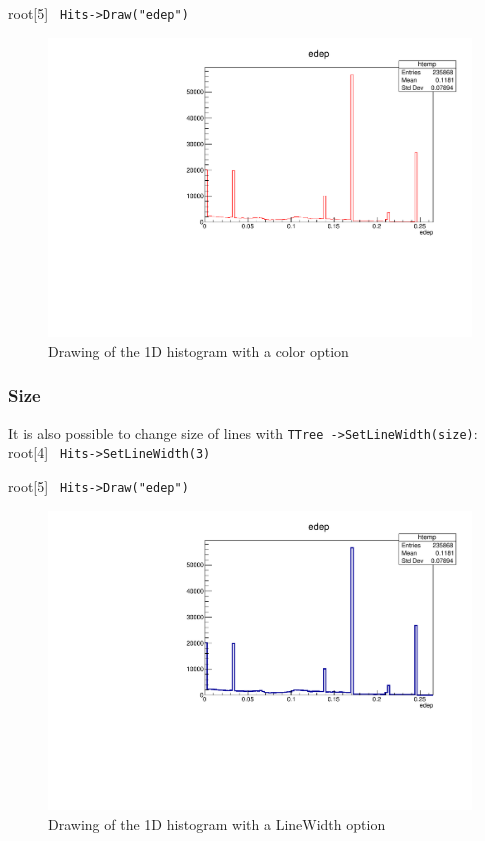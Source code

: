 \documentclass[12pt]{article}
\begin{document}
root[5] \verb| Hits->Draw("edep") | \\
\begin{figure}[h]
\centering
\includegraphics[scale=0.5]{figs/1Dhist_color.pdf}
\caption{Drawing of the 1D histogram with a color option}
\label{fig:1Dhist_color}
\end{figure}

\subsubsection{Size}
It is also possible to change size of lines with \verb|TTree ->SetLineWidth(size)|: \\

root[4] \verb| Hits->SetLineWidth(3) |

root[5] \verb| Hits->Draw("edep") | \\

\begin{figure}[h]
\centering
\includegraphics[scale=0.5]{figs/1Dhist_linewidth.pdf}
\caption{Drawing of the 1D histogram with a LineWidth option}
\label{fig:1Dhist_color}
\end{figure}
\end{document}
